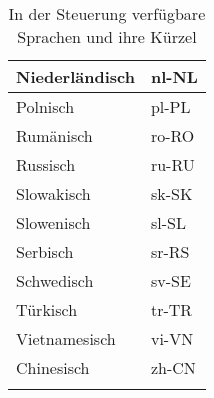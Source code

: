 \begin{longtable}[h]{ | p{5cm} | P{2cm} | }
	\hline
	Niederländisch				& nl-NL \\
	\hline
	Polnisch					& pl-PL \\
	\hline
	Rumänisch					& ro-RO \\
	\hline
	Russisch					& ru-RU \\
	\hline
	Slowakisch					& sk-SK \\
	\hline
	Slowenisch					& sl-SL \\ 
	\hline
	Serbisch					& sr-RS \\
	\hline
	Schwedisch					& sv-SE \\
	\hline
	Türkisch					& tr-TR \\
	\hline
	Vietnamesisch				& vi-VN \\
	\hline
	Chinesisch					& zh-CN \\
	\hline
	\caption{In der Steuerung verfügbare Sprachen und ihre Kürzel}
\end{longtable}
\pagebreak